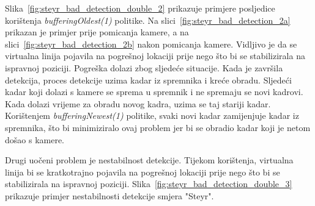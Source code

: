 Slika~\ref{fig:steyr_bad_detection_double_2} prikazuje primjere posljedice korištenja \textit{bufferingOldest(1)} politike. Na slici~\ref{fig:steyr_bad_detection_2a} prikazan je primjer prije pomicanja kamere, a na slici~\ref{fig:steyr_bad_detection_2b} nakon pomicanja kamere. Vidljivo je da se virtualna linija pojavila na pogrešnoj lokaciji prije nego što bi se stabilizirala na ispravnoj poziciji. Pogreška dolazi zbog sljedeće situacije. Kada je završila detekcija, proces detekcije uzima kadar iz spremnika i kreće obradu. Sljedeći kadar koji dolazi s kamere se sprema u spremnik i ne spremaju se novi kadrovi. Kada dolazi vrijeme za obradu novog kadra, uzima se taj stariji kadar. Korištenjem \textit{bufferingNewest(1)} politike, svaki novi kadar zamijenjuje kadar iz spremnika, što bi minimiziralo ovaj problem jer bi se obradio kadar koji je netom došao s kamere.



Drugi uočeni problem je nestabilnost detekcije. Tijekom korištenja, virtualna linija bi se kratkotrajno pojavila na pogrešnoj lokaciji prije nego što bi se stabilizirala na ispravnoj poziciji. Slika~\ref{fig:steyr_bad_detection_double_3} prikazuje primjer nestabilnosti detekcije smjera "Steyr".

